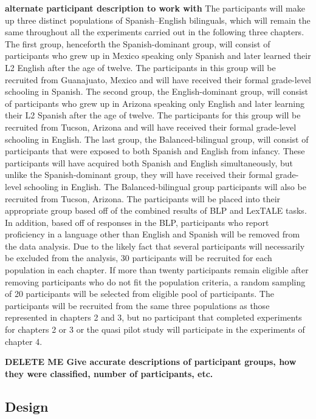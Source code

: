 \textbf{alternate participant description to work with}
The participants will make up three distinct populations of Spanish–English bilinguals, which will remain the same throughout all the experiments carried out in the following three chapters. The first group, henceforth the Spanish-dominant group, will consist of participants who grew up in Mexico speaking only Spanish and later learned their L2 English after the age of twelve. The participants in this group will be recruited from Guanajuato, Mexico and will have received their formal grade-level schooling in Spanish. The second group, the English-dominant group, will consist of participants who grew up in Arizona speaking only English and later learning their L2 Spanish after the age of twelve. The participants for this group will be recruited from Tucson, Arizona and will have received their formal grade-level schooling in English. The last group, the Balanced-bilingual group, will consist of participants that were exposed to both Spanish and English from infancy. These participants will have acquired both Spanish and English simultaneously, but unlike the Spanish-dominant group, they will have received their formal grade-level schooling in English. The Balanced-bilingual group participants will also be recruited from Tucson, Arizona. The participants will be placed into their appropriate group based off of the combined results of BLP and LexTALE tasks. In addition, based off of responses in the BLP, participants who report proficiency in a language other than English and Spanish will be removed from the data analysis. Due to the likely fact that several participants will necessarily be excluded from the analysis, 30 participants will be recruited for each population in each chapter. If more than twenty participants remain eligible after removing participants who do not fit the population criteria, a random sampling of 20 participants will be selected from eligible pool of participants. The participants will be recruited from the same three populations as those represented in chapters 2 and 3, but no participant that completed experiments for chapters 2 or 3 or the quasi pilot study will participate in the experiments of chapter 4. 

\textbf{DELETE ME
Give accurate descriptions of participant groups, how they were classified, number of participants, etc.}


\subsection{Design}

